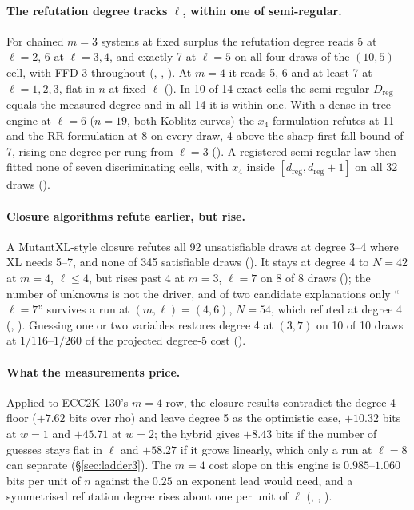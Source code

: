 \paragraph{The refutation degree tracks $\ell$, within one of semi-regular.}
For chained $m=3$ systems at fixed surplus the refutation degree reads 5 at
$\ell=2$, 6 at $\ell=3,4$, and exactly 7 at $\ell=5$ on all four draws of
the $(10,5)$ cell, with FFD 3 throughout
(,
,
). At $m=4$ it reads 5, 6 and at
least 7 at $\ell=1,2,3$, flat in $n$ at fixed $\ell$
(). In 10 of 14 exact cells the
semi-regular $D_{\mathrm{reg}}$ equals the measured degree and in all 14 it
is within one. With a dense in-tree engine at $\ell=6$ ($n=19$, both
Koblitz curves) the $x_4$ formulation refutes at 11 and the RR formulation at
8 on every draw, 4 above the sharp first-fall bound of 7, rising one degree
per rung from $\ell=3$ (). A
registered semi-regular law then fitted none of seven discriminating cells,
with $x_4$ inside $[d_{\mathrm{reg}},d_{\mathrm{reg}}+1]$ on all 32 draws
().

\paragraph{Closure algorithms refute earlier, but rise.} A MutantXL-style
closure refutes all 92 unsatisfiable draws at degree 3--4 where XL needs
5--7, and none of 345 satisfiable draws
(). It stays at degree 4 to
$N=42$ at $m=4$, $\ell\le4$, but rises past 4 at $m=3$, $\ell=7$ on 8 of 8
draws (); the number of unknowns
is not the driver, and of two candidate explanations only ``$\ell=7$''
survives a run at $(m,\ell)=(4,6)$, $N=54$, which refuted at degree 4
(,
). Guessing one or two variables
restores degree 4 at $(3,7)$ on 10 of 10 draws at $1/116$--$1/260$ of the
projected degree-5 cost ().

\paragraph{What the measurements price.} Applied to ECC2K-130's $m=4$ row,
the closure results contradict the degree-4 floor ($+7.62$ bits over rho)
and leave degree 5 as the optimistic case, $+10.32$ bits at $w=1$ and
$+45.71$ at $w=2$; the hybrid gives $+8.43$ bits if the number of guesses
stays flat in $\ell$ and $+58.27$ if it grows linearly, which only a run at
$\ell=8$ can separate (\S\ref{sec:ladder3}). The $m=4$ cost slope on this
engine is $0.985$--$1.060$ bits per unit of $n$ against the $0.25$ an exponent
lead would need, and a symmetrised refutation degree rises about one per
unit of $\ell$ (,
,
).

